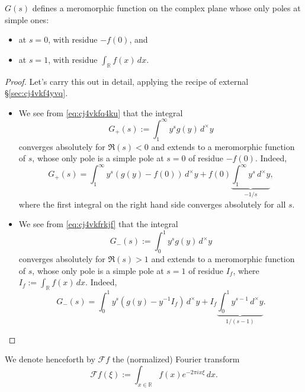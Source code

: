 \documentclass[reqno]{amsart}  \numberwithin{theorem}{section} \numberwithin{equation}{section}
\begin{document}
\begin{lemma}
  $G(s)$ defines a meromorphic function on the complex plane whose only poles at simple ones:
  \begin{itemize}
\item at $s = 0$, with residue $-f(0)$, and
\item at $s = 1$, with residue $\int_{\mathbb{R}} f(x) \,d x $.
\end{itemize}
\end{lemma}
\begin{proof}
  Let's carry this out in detail, applying the recipe of external \S\ref{sec:cj4vkf4yvq}.
  \begin{itemize}
  \item We see from \eqref{eq:cj4vkfq4ku} that the integral
    \begin{equation*}
      G_+(s) := \int_1^\infty y^s g(y) \,d^\times y
    \end{equation*}
    converges absolutely for $\Re(s) < 0$ and extends to a meromorphic function of $s$, whose only pole is a simple pole at $s = 0$ of residue $-f(0)$.  Indeed,
    \begin{equation*}
      G_+(s) = \int_1^\infty y^s \left(g (y) - f(0) \right) \,d^\times y
      + f(0)
      \underbrace
      {
        \int_1^\infty y^{s} \,d^\times y
      }_{
        -1/s
      },
    \end{equation*}
    where the first integral on the right hand side converges absolutely for all $s$.
  \item We see from \eqref{eq:cj4vkfrkjf} that the integral
    \begin{equation*}
      G_-(s) := \int_0^1 y^s g(y) \,d^\times y
    \end{equation*}
    converges absolutely for $\Re(s) > 1$ and extends to a meromorphic function of $s$, whose only pole is a simple pole at $s = 1$ of residue $I_f$, where $I_f := \int_{\mathbb{R} } f (x) \, d x$.  Indeed,
    \begin{equation*}
      G_-(s) = \int_0^1 y^s \left( g (y) - y^{-1} I_f \right) \,d^\times y + I_f \underbrace
      {
        \int_0^1 y^{s-1} \,d^\times y
      }_{
        1/(s-1)
      }.
    \end{equation*}
  \end{itemize}
\end{proof}

We denote henceforth by $\mathcal{F} f$ the (normalized) Fourier transform
  \begin{equation*}
\mathcal{F} f (\xi) := \int_{x \in \mathbb{R} } f(x) e^{- 2 \pi i x \xi } \, d x.
\end{equation*}
\end{document}
